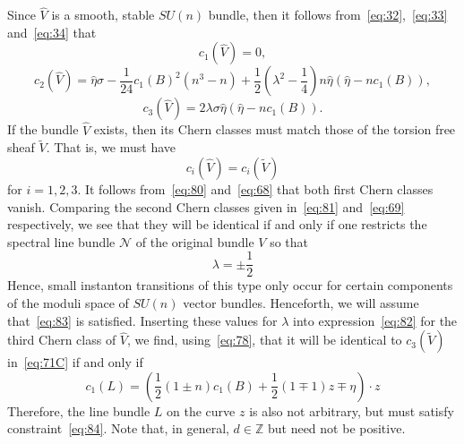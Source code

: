 \documentclass[a4paper,12pt]{article}
\numberwithin{equation}{section}
\def\cN{{\mathcal N}}
\theoremstyle{plain}
\begin{document}
Since $\widehat{V}$ is a smooth, stable $SU(n)$ bundle, 
then it follows from~\eqref{eq:32},~\eqref{eq:33} and~\eqref{eq:34} that
\begin{equation}
c_{1}(\widehat{V})=0,
\label{eq:80}
\end{equation}
\begin{equation}
c_2(\widehat{V})=\hat{\eta}\sigma-\frac{1}{24}c_1(B)^2(n^3-n)
+\frac{1}{2}(\lambda^2-\frac{1}{4})n\hat{\eta}(\hat{\eta}-nc_1(B)), 
\label{eq:81}
\end{equation}
\begin{equation}
c_3(\widehat{V})= 2\lambda \sigma \hat{\eta}(\hat{\eta}-nc_1(B)). 
\label{eq:82} 
\end{equation}
If the bundle $\widehat{V}$ exists, then its Chern classes must match
those of the 
torsion free sheaf $\widetilde{V}$. That is, we must have
\begin{equation}
c_{i}(\widehat{V})=c_{i}(\widetilde{V})
\label{eq:82A}
\end{equation}
for $i=1,2,3$. It follows from~\eqref{eq:80}
and~\eqref{eq:68} that both first Chern classes vanish. Comparing the second
Chern classes given in~\eqref{eq:81} and~\eqref{eq:69} respectively, 
we see that they will be identical if and only if one restricts the spectral
line bundle $\cN$ of the original 
bundle $V$ so that
\begin{equation}
\lambda=\pm\frac{1}{2}
\label{eq:83}
\end{equation}
Hence, small instanton transitions of this type only occur for certain
components of the moduli space of 
$SU(n)$ vector bundles. Henceforth, we will assume
that~\eqref{eq:83} is satisfied. Inserting these values for $\lambda$ into 
expression~\eqref{eq:82} for the third Chern class of $\widehat{V}$, we find,
using~\eqref{eq:78}, that it will be identical to $c_{3}(\widetilde{V})$
in~\eqref{eq:71C} if and only if
\begin{equation}
c_{1}(L)=\left(\frac{1}{2}(1\pm n)c_{1}(B)+\frac{1}{2}(1\mp 1)z 
\mp\eta\right) \cdot z 
\label{eq:84}
\end{equation}
Therefore, the line bundle $L$ on the
 curve $z$ is also not arbitrary, but must
satisfy constraint~\eqref{eq:84}. Note that, in general, $d \in
 {\mathbb Z}$ but need not be positive.
\end{document}
